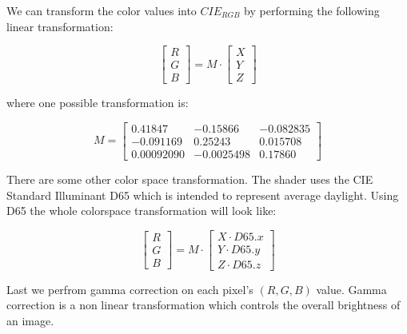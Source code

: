 We can transform the color values into $CIE_{RGB}$ by performing the following linear transformation:

\begin{equation}
\begin{bmatrix}R\\G\\B\end{bmatrix} = M \cdot \begin{bmatrix}X\\Y\\Z\end{bmatrix}
\end{equation} 

where one possible transformation is: 

\begin{equation}
M = \begin{bmatrix} 0.41847 & -0.15866 & -0.082835\\ -0.091169 & 0.25243 & 0.015708\\ 0.00092090 & -0.0025498 & 0.17860 \end{bmatrix}
\end{equation}

There are some other color space transformation. The shader uses the CIE Standard Illuminant D65 which is intended to represent average daylight. Using D65 the whole colorspace transformation will look like:

\begin{equation}
\begin{bmatrix}R\\G\\B\end{bmatrix} = M \cdot \begin{bmatrix}X \cdot D65.x \\ Y \cdot D65.y \\Z \cdot D65.z \end{bmatrix} 
\end{equation}

Last we perfrom gamma correction on each pixel's $(R,G,B)$ value. Gamma correction is a non linear transformation which controls the overall brightness of an image.

